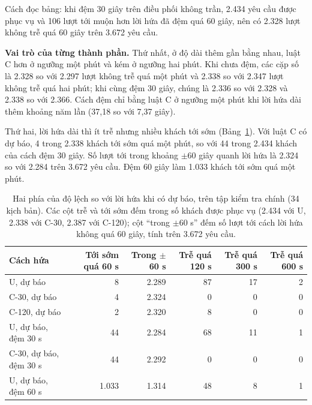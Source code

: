 Cách đọc bảng: khi đệm 30 giây trên điều phối không trần, 2.434 yêu cầu được phục vụ và 106 lượt tới muộn hơn lời
hứa đã đệm quá 60 giây, nên có 2.328 lượt không trễ quá 60 giây trên 3.672 yêu cầu.

\textbf{Vai trò của từng thành phần.} Thứ nhất, ở độ dài thêm gần bằng nhau, luật C hơn ở ngưỡng một phút và kém ở
ngưỡng hai phút. Khi chưa đệm, các cặp số là 2.328 so với 2.297 lượt không trễ quá một phút và 2.338 so với 2.347
lượt không trễ quá hai phút; khi cùng đệm 30 giây, chúng là 2.336 so với 2.328 và 2.338 so với 2.366. Cách đệm chỉ
bằng luật C ở ngưỡng một phút khi lời hứa dài thêm khoảng năm lần (37,18 so với 7,37 giây).

Thứ hai, lời hứa dài thì ít trễ nhưng nhiều khách tới sớm (Bảng~\ref{bang:c4-haiphia}). Với luật C có dự báo, 4
trong 2.338 khách tới sớm quá một phút, so với 44 trong 2.434 khách của cách đệm 30 giây. Số lượt tới trong khoảng
$\pm$60 giây quanh lời hứa là 2.324 so với 2.284 trên 3.672 yêu cầu. Đệm 60 giây làm 1.033 khách tới sớm quá một
phút.

\begin{table}[htbp]
\centering
\caption{Hai phía của độ lệch so với lời hứa khi có dự báo, trên tập kiểm tra chính (34 kịch bản). Các cột trễ và
tới sớm đếm trong số khách được phục vụ (2.434 với U, 2.338 với C-30, 2.387 với C-120); cột ``trong $\pm$60 s''
đếm số lượt tới cách lời hứa không quá 60 giây, tính trên 3.672 yêu cầu.}
\label{bang:c4-haiphia}
\small
\begin{tabular}{@{}p{4.4cm}rrrrr@{}}
\toprule
\textbf{Cách hứa} & \textbf{Tới sớm quá 60 s} & \textbf{Trong $\pm$60 s} & \textbf{Trễ quá 120 s} &
\textbf{Trễ quá 300 s} & \textbf{Trễ quá 600 s}\\
\midrule
U, dự báo & 8 & 2.289 & 87 & 17 & 2\\
C-30, dự báo & 4 & 2.324 & 0 & 0 & 0\\
C-120, dự báo & 2 & 2.320 & 8 & 0 & 0\\
U, dự báo, đệm 30 s & 44 & 2.284 & 68 & 11 & 1\\
C-30, dự báo, đệm 30 s & 44 & 2.292 & 0 & 0 & 0\\
U, dự báo, đệm 60 s & 1.033 & 1.314 & 48 & 8 & 1\\
\bottomrule
\end{tabular}
\end{table}

